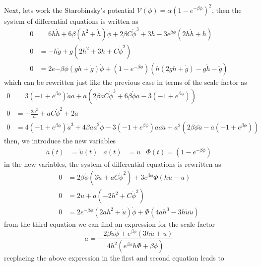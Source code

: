 \documentclass[10pt,a4paper]{article}
\begin{document}
Next, lets work the Starobinsky's potential $\mathcal{V}(\phi) = \alpha \left(1 - e^{-\beta\phi}\right)^2$, then the system of differential equations
is written as 
\begin{align}
  0 & = 6h\dot{h} + 6\beta\left(h^2 + \dot{h}\right)\dot{\phi} + 2\beta C\dot{\phi}^3 + 3\ddot{h} - 3e^{\beta\phi}\left(2h\dot{h} + \ddot{h}\right) \\
  0 & = -h\dot{g} + g\left(2h^2 + 3\dot{h} + C\dot{\phi}^2\right) \\
  0 & =  2e{-\beta\phi}\left(gh + \dot{g}\right)\dot{\phi} + \left(1 - e^{-\beta\phi}\right)\left(h\left(2gh + \dot{g}\right) - g\dot{h} - \ddot{g}\right)
\end{align}
which can be rewritten just like the previous case in terms of the scale factor as
\begin{align}
  0 & = 3\left(-1 + e^{\beta\phi}\right)\dot{a}\ddot{a} + a\left(2\beta a C \dot{\phi}^3 + 6 \beta \dot{\phi}\ddot{a} - 3\left(-1 + e^{\beta\phi}\right)\right) \\
  0 & = -\frac{2\dot{a}^2}{a} + aC\dot{\phi}^2 + 2\ddot{a}\\
  0 & = 4\left(-1 + e^{\beta\phi}\right)\dot{a}^3 + 4\beta a \dot{a}^2\dot{\phi} - 3\left(-1 + e^{\beta\phi}\right)a\dot{a}\ddot{a} + a^2\left(2\beta\dot{\phi}\ddot{a} - \dddot{a}\left(-1 + e^{\beta\phi}\right)\right)
\end{align}
then, we introduce the new variables
\begin{align}
  \ddot{a}(t) & = \dot{u}(t) & \dddot{a}(t) & = \ddot{u} & \Phi (t) = (1 - e^{-\beta\phi})
\end{align}
in the new variables, the system of differential equations is rewritten as
\begin{align}
  0 & = 2\beta\dot{\phi}\left(3\dot{u} + a C\dot{\phi}^2\right) + 3e^{\beta\phi}\Phi \left(h\dot{u} - \ddot{u}\right) \\
  0 & = 2\dot{u} + a\left(-2h^2 + C\dot{\phi}^2\right) \\
  0 & = 2e^{-\beta\phi}\left(2ah^2 + \dot{u}\right)\dot{\phi} + \Phi\left(4ah^3 - 3h\dot{u}\ddot{u}\right)
\end{align}
from the third equation we can find an expression for the scale factor 
\begin{equation}
  a = \frac{-2\beta\dot{u}\dot{\phi} + e^{\beta\phi}\left(3h\dot{u} + \ddot{u}\right)}{4h^2\left(e^{\beta\phi}h\Phi + \beta\dot{\phi}\right)}
\end{equation}
reeplacing the above expression in the first and second equation leads to
\end{document}
